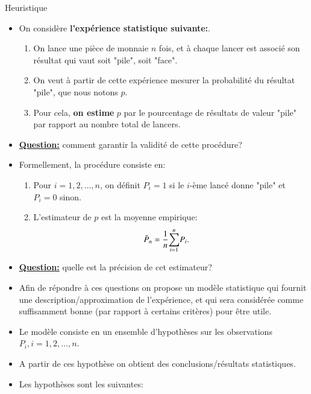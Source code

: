\begin{frame}[allowframebreaks]{Heuristique}
\begin{itemize}
    \item On considère \textbf{l'expérience statistique suivante:}.
    \begin{enumerate}[-]
        \item On lance une pièce de monnaie $n$ fois, et à chaque lancer est associé 
    son résultat qui vaut soit "pile", soit "face".
        \item On veut à partir de cette expérience mesurer la probabilité du résultat "pile", que nous notons $p$.
        \item Pour cela, \textbf{on estime} $p$ par le pourcentage de résultats de valeur "pile" par rapport au nombre total de lancers.
     \end{enumerate}
    \item \textbf{\underline{Question:}} comment garantir la validité de cette procédure?

\framebreak

    \item Formellement, la procédure consiste en:
    \begin{enumerate}[-]
    \item Pour $i=1, 2, \ldots, n$, on définit $P_i = 1$ si le $i$-ème lancé donne "pile" et $P_i=0$ sinon.
    \item L'estimateur de $p$ est la moyenne empirique:
    \begin{align*}
        \bar{P}_n &=\frac{1}{n}{\sum_{i=1}^n} P_i.
    \end{align*}
    \end{enumerate}
    \item \textbf{\underline{Question:}} quelle est la précision de cet estimateur?
    \item Afin de répondre à ces questions on propose un modèle statistique qui fournit une description/approximation de l'expérience, et qui sera considérée comme suffisamment bonne
    (par rapport à certains critères) pour être utile.
    \framebreak

    \item Le modèle consiste en un ensemble  d'hypothèses sur les 
     observations $P_i, i=1, 2, \ldots, n$.
     \item  A partir de ces hypothèse on obtient des conclusions/résultats statistiques.

    \item Les hypothèses sont les suivantes:


\end{itemize}
\end{frame}
